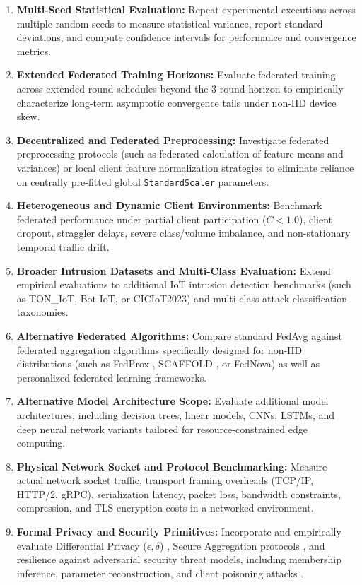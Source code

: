 \documentclass[11pt,a4paper]{article}
\begin{document}
\begin{enumerate}
    \item \textbf{Multi-Seed Statistical Evaluation:} Repeat experimental executions across multiple random seeds to measure statistical variance, report standard deviations, and compute confidence intervals for performance and convergence metrics.
    \item \textbf{Extended Federated Training Horizons:} Evaluate federated training across extended round schedules beyond the 3-round horizon to empirically characterize long-term asymptotic convergence tails under non-IID device skew.
    \item \textbf{Decentralized and Federated Preprocessing:} Investigate federated preprocessing protocols (such as federated calculation of feature means and variances) or local client feature normalization strategies to eliminate reliance on centrally pre-fitted global \texttt{StandardScaler} parameters.
    \item \textbf{Heterogeneous and Dynamic Client Environments:} Benchmark federated performance under partial client participation ($C < 1.0$), client dropout, straggler delays, severe class/volume imbalance, and non-stationary temporal traffic drift.
    \item \textbf{Broader Intrusion Datasets and Multi-Class Evaluation:} Extend empirical evaluations to additional IoT intrusion detection benchmarks (such as TON\_IoT, Bot-IoT, or CICIoT2023) and multi-class attack classification taxonomies.
    \item \textbf{Alternative Federated Algorithms:} Compare standard FedAvg \cite{ref1} against federated aggregation algorithms specifically designed for non-IID distributions (such as FedProx \cite{ref9}, SCAFFOLD \cite{ref10}, or FedNova) as well as personalized federated learning frameworks.
    \item \textbf{Alternative Model Architecture Scope:} Evaluate additional model architectures, including decision trees, linear models, CNNs, LSTMs, and deep neural network variants tailored for resource-constrained edge computing.
    \item \textbf{Physical Network Socket and Protocol Benchmarking:} Measure actual network socket traffic, transport framing overheads (TCP/IP, HTTP/2, gRPC), serialization latency, packet loss, bandwidth constraints, compression, and TLS encryption costs in a networked environment.
    \item \textbf{Formal Privacy and Security Primitives:} Incorporate and empirically evaluate Differential Privacy ($\epsilon, \delta$) \cite{ref11, ref12}, Secure Aggregation protocols \cite{ref13}, and resilience against adversarial security threat models, including membership inference, parameter reconstruction, and client poisoning attacks \cite{ref14, ref15}.

\end{enumerate}
\end{document}
